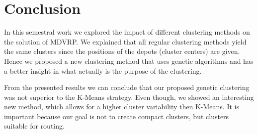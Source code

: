\documentclass[conference]{IEEEtran}
\begin{document}
\section{Conclusion}
In this semestral work we explored the impact of different clustering methods on the solution of MDVRP. We explained that all regular clustering methods yield the same clusters since the positions of the depots (cluster centers) are given. Hence we proposed a new clustering method that uses genetic algorithms and has a better insight in what actually is the purpose of the clustering.

From the presented results we can conclude that our proposed genetic clustering was not superior to the K-Means strategy. Even though, we showed an interesting new method, which allows for a higher cluster variability then K-Means. It is important because our goal is not to create compact clusters, but clusters suitable for routing.




\nocite{*} %


\end{document}

